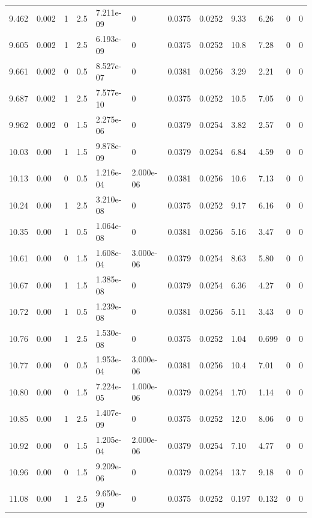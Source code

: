 \documentclass[preview]{standalone}
\begin{document}
{{{{\begin{tabular}{L{1.2cm}C{1.2cm} C{0.3cm}C{0.5cm} C{1.4cm}C{1.4cm} C{1.4cm}C{1.4cm} C{1.6cm}C{1.6cm} C{1.6cm}C{1.6cm}}
  9.462  &  0.002  & 1     & 2.5 &  7.211e-09  & 0  &  0.0375&   0.0252& 9.33 & 6.26   &  0 & 0  \\ 
  9.605  &  0.002  & 1     & 2.5 &  6.193e-09  & 0  &  0.0375&   0.0252& 10.8 & 7.28   &  0 & 0  \\ 
  9.661  &  0.002  & 0     & 0.5 &  8.527e-07  & 0  &  0.0381&   0.0256& 3.29 & 2.21   &  0 & 0  \\ 
  9.687  &  0.002  & 1     & 2.5 &  7.577e-10  & 0  &  0.0375&   0.0252& 10.5 & 7.05   &  0 & 0  \\ 
  9.962  &  0.002  & 0     & 1.5 &  2.275e-06  & 0  &  0.0379&   0.0254& 3.82 & 2.57   &  0 & 0  \\ 
  10.03  &  0.00  & 1     & 1.5 &  9.878e-09  & 0  &  0.0379&   0.0254& 6.84 & 4.59   &  0 & 0  \\ 
  10.13  &  0.00  & 0     & 0.5 &  1.216e-04  & 2.000e-06  &  0.0381&   0.0256& 10.6 & 7.13   &  0 & 0  \\ 
  10.24  &  0.00  & 1     & 2.5 &  3.210e-08  & 0  &  0.0375&   0.0252& 9.17 & 6.16   &  0 & 0  \\ 
  10.35  &  0.00  & 1     & 0.5 &  1.064e-08  & 0  &  0.0381&   0.0256& 5.16 & 3.47   &  0 & 0  \\ 
  10.61  &  0.00  & 0     & 1.5 &  1.608e-04  & 3.000e-06  &  0.0379&   0.0254& 8.63 & 5.80   &  0 & 0  \\ 
  10.67  &  0.00  & 1     & 1.5 &  1.385e-08  & 0  &  0.0379&   0.0254& 6.36 & 4.27   &  0 & 0  \\ 
  10.72  &  0.00  & 1     & 0.5 &  1.239e-08  & 0  &  0.0381&   0.0256& 5.11 & 3.43   &  0 & 0  \\ 
  10.76  &  0.00  & 1     & 2.5 &  1.530e-08  & 0  &  0.0375&   0.0252& 1.04 & 0.699   &  0 & 0  \\ 
  10.77  &  0.00  & 0     & 0.5 &  1.953e-04  & 3.000e-06  &  0.0381&   0.0256& 10.4 & 7.01   &  0 & 0  \\ 
  10.80  &  0.00  & 0     & 1.5 &  7.224e-05  & 1.000e-06  &  0.0379&   0.0254& 1.70 & 1.14   &  0 & 0  \\ 
  10.85  &  0.00  & 1     & 2.5 &  1.407e-09  & 0  &  0.0375&   0.0252& 12.0 & 8.06   &  0 & 0  \\ 
  10.92  &  0.00  & 0     & 1.5 &  1.205e-04  & 2.000e-06  &  0.0379&   0.0254& 7.10 & 4.77   &  0 & 0  \\ 
  10.96  &  0.00  & 0     & 1.5 &  9.209e-06  & 0  &  0.0379&   0.0254& 13.7 & 9.18   &  0 & 0  \\ 
  11.08  &  0.00  & 1     & 2.5 &  9.650e-09  & 0  &  0.0375&   0.0252& 0.197 & 0.132   &  0 & 0  \\ 

\end{tabular}}}}}
\end{document}
